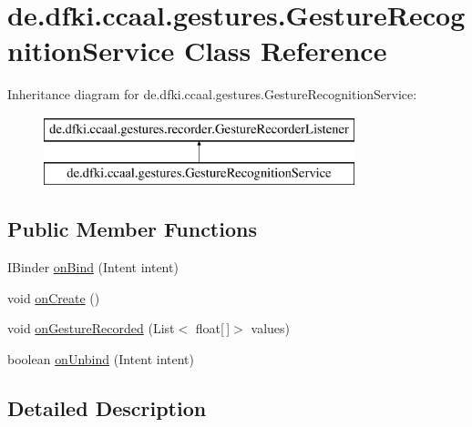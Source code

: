 \hypertarget{classde_1_1dfki_1_1ccaal_1_1gestures_1_1_gesture_recognition_service}{\section{de.\-dfki.\-ccaal.\-gestures.\-Gesture\-Recognition\-Service Class Reference}
\label{classde_1_1dfki_1_1ccaal_1_1gestures_1_1_gesture_recognition_service}
}
Inheritance diagram for de.\-dfki.\-ccaal.\-gestures.\-Gesture\-Recognition\-Service\-:\begin{figure}[H]
\begin{center}
\leavevmode
\includegraphics[height=2.000000cm]{classde_1_1dfki_1_1ccaal_1_1gestures_1_1_gesture_recognition_service}
\end{center}
\end{figure}
\subsection*{Public Member Functions}
\begin{DoxyCompactItemize}
\item 
I\-Binder \hyperlink{classde_1_1dfki_1_1ccaal_1_1gestures_1_1_gesture_recognition_service_a91bbd898c1a5793f931f7ea19a6b95f8}{on\-Bind} (Intent intent)
\item 
void \hyperlink{classde_1_1dfki_1_1ccaal_1_1gestures_1_1_gesture_recognition_service_a7b12cc029976a25889f01487d6e0c5cf}{on\-Create} ()
\item 
void \hyperlink{classde_1_1dfki_1_1ccaal_1_1gestures_1_1_gesture_recognition_service_adf028fb7892ff0add73af2c17f6d6794}{on\-Gesture\-Recorded} (List$<$ float\mbox{[}$\,$\mbox{]}$>$ values)
\item 
boolean \hyperlink{classde_1_1dfki_1_1ccaal_1_1gestures_1_1_gesture_recognition_service_ae2fc2e312a84d18d2469c779a20e6361}{on\-Unbind} (Intent intent)
\end{DoxyCompactItemize}


\subsection{Detailed Description}


